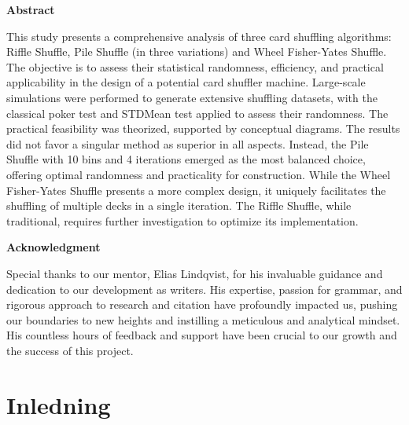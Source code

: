 \documentclass[swedish,a4paper]{article}
\begin{document}


\begin{center}
    \large
    \textbf{Abstract}
\end{center}
\vspace{0.5cm} 
\begin{adjustwidth}{2cm}{2cm} 
This study presents a comprehensive analysis of three card shuffling algorithms:
Riffle Shuffle, Pile Shuffle (in three variations) and Wheel Fisher-Yates
Shuffle. The objective is to assess their statistical randomness, efficiency,
and practical applicability in the design of a potential card shuffler machine.
Large-scale simulations were performed to generate extensive shuffling datasets,
with the classical poker test and STDMean test applied to assess their
randomness. The practical feasibility was theorized, supported by conceptual
diagrams. The results did not favor a singular method as superior in all
aspects. Instead, the Pile Shuffle with 10 bins and 4 iterations emerged as the
most balanced choice, offering optimal randomness and practicality for
construction. While the Wheel Fisher-Yates Shuffle presents a more complex
design, it uniquely facilitates the shuffling of multiple decks in a single
iteration. The Riffle Shuffle, while traditional, requires further investigation
to optimize its implementation.
\vspace{1cm} 
\begin{center}
    \large
    \textbf{Acknowledgment}
\end{center}
\vspace{0.5cm} 
Special thanks to our mentor, Elias Lindqvist, for his invaluable guidance and
dedication to our development as writers. His expertise, passion for grammar,
and rigorous approach to research and citation have profoundly impacted us,
pushing our boundaries to new heights and instilling a meticulous and analytical
mindset. His countless hours of feedback and support have been crucial to our
growth and the success of this project.
\newpage

\end{adjustwidth}


\tableofcontents
\newpage

\glsaddall[] %
\printglossary[title=Ordlista] %
\newpage

\section{Inledning}
\end{document}
